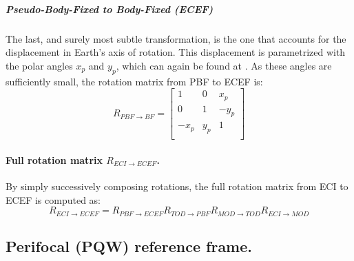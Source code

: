 		\subparagraph{Pseudo-Body-Fixed to Body-Fixed (ECEF)\\}
		\indent The last, and surely most subtle transformation, is the one that accounts for the displacement in Earth's axis of rotation. This displacement is parametrized with the polar angles $x_p$ and $y_p$, which can again be found at \cite{IERS_conventions}. As these angles are sufficiently small, the rotation matrix from PBF to ECEF is:\\
		\begin{equation}
		R_{PBF\rightarrow BF} = 
		\left[ 
		\begin{array}{lll}
		1		& 0 	& x_p \\
		0 		& 1 	& -y_p \\
		-x_p 	& y_p 	& 1 \\
		\end{array}
		\right]
		\label{eq: R_PBF_ECEF}
		\end{equation}
		\paragraph{Full rotation matrix $R_{ECI\rightarrow ECEF}$. \\}
		\indent By simply successively composing rotations, the full rotation matrix from ECI to ECEF is computed as:
		\[
		R_{ECI\rightarrow ECEF} = R_{PBF \rightarrow ECEF} R_{TOD \rightarrow PBF} R_{MOD\rightarrow TOD} R_{ECI\rightarrow MOD}		
		\]
	\subsection{Perifocal (PQW) reference frame.}
